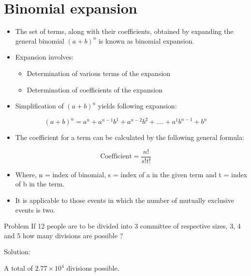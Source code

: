 \documentclass[11pt,ignorenonframetext,aspectratio=169]{beamer}
\providecommand{\tightlist}{%
  \setlength{\itemsep}{0pt}\setlength{\parskip}{0pt}}
\begin{document}
\hypertarget{binomial-expansion}{%
\section{Binomial expansion}\label{binomial-expansion}}

\begin{frame}{}
\protect\hypertarget{section-6}{}
\begin{itemize}
\tightlist
\item
  The set of terms, along with their coefficients, obtained by expanding
  the general binomial \((a + b)^n\) is known as binomial expansion.
\item
  Expansion involves:

  \begin{itemize}
  \tightlist
  \item
    Determination of various terms of the expansion
  \item
    Determination of coefficients of the expansion
  \end{itemize}
\item
  Simplification of \((a + b)^n\) yields following expansion:
\end{itemize}

\[
(a + b)^n = a^n + a^{n-1}b^1 + a^{n-2}b^2 + .... + a^1b^{n-1} + b^n
\]

\begin{itemize}
\tightlist
\item
  The coefficient for a term can be calculated by the following general
  formula:
\end{itemize}

\[
\text{Coefficient} = \frac{n!}{s! t!}
\]

\begin{itemize}
\tightlist
\item
  Where, n = index of binomial, s = index of a in the given term and t =
  index of b in the term.
\item
  It is applicable to those events in which the number of mutually
  exclusive events is two.
\end{itemize}
\end{frame}

\begin{frame}{Problem}
\protect\hypertarget{problem}{}
If 12 people are to be divided into 3 committee of respective sizes, 3,
4 and 5 how many divisions are possible ?

Solution:

A total of \ensuremath{2.77\times 10^{4}} divisions possible.
\end{frame}
\end{document}

